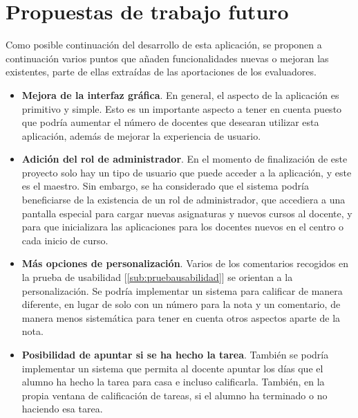 \section{Propuestas de trabajo futuro}
\label{sec:trabajofuturo}
Como posible continuación del desarrollo de esta aplicación, se proponen a continuación varios puntos que añaden funcionalidades nuevas o mejoran las existentes, parte de ellas extraídas de las aportaciones de los evaluadores.

\begin{itemize}
	\item \textbf{Mejora de la interfaz gráfica}. En general, el aspecto de la aplicación es primitivo y simple. Esto es un importante aspecto a tener en cuenta puesto que podría aumentar el número de docentes que desearan utilizar esta aplicación, además de mejorar la experiencia de usuario.
	\item \textbf{Adición del rol de administrador}. En el momento de finalización de este proyecto solo hay un tipo de usuario que puede acceder a la aplicación, y este es el maestro. Sin embargo, se ha considerado que el sistema podría beneficiarse de la existencia de un rol de administrador, que accediera a una pantalla especial para cargar nuevas asignaturas y nuevos cursos al docente, y para que inicializara las aplicaciones para los docentes nuevos en el centro o cada inicio de curso.
	\item \textbf{Más opciones de personalización}. Varios de los comentarios recogidos en la prueba de usabilidad [\ref{sub:pruebausabilidad}] se orientan a la personalización. Se podría implementar un sistema para calificar de manera diferente, en lugar de solo con un número para la nota y un comentario, de manera menos sistemática para tener en cuenta otros aspectos aparte de la nota.
	\item \textbf{Posibilidad de apuntar si se ha hecho la tarea}. También se podría implementar un sistema que permita al docente apuntar los días que el alumno ha hecho la tarea para casa e incluso calificarla. También, en la propia ventana de calificación de tareas, si el alumno ha terminado o no haciendo esa tarea.
\end{itemize}
